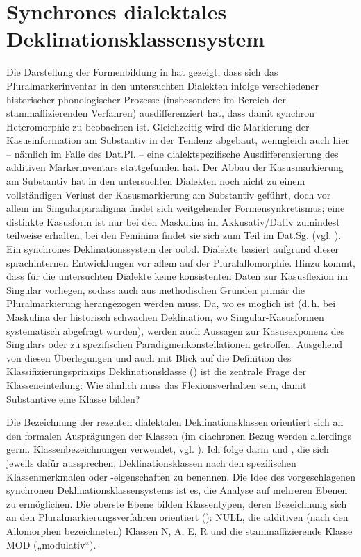 \section{Synchrones dialektales Deklinationsklassensystem}
\label{sec:8.1}
Die Darstellung der Formenbildung in  hat gezeigt, dass sich das Pluralmarkerinventar in den untersuchten Dialekten infolge verschiedener historischer phonologischer Prozesse (insbesondere im Bereich der stammaffizierenden Verfahren) ausdifferenziert hat, dass damit synchron Heteromorphie zu beobachten ist. Gleichzeitig wird die Markierung der Kasusinformation am Substantiv in der Tendenz abgebaut, wenngleich auch hier -- nämlich im Falle des Dat.Pl. -- eine dialektspezifische Ausdifferenzierung des additiven Markerinventars stattgefunden hat. Der Abbau der Kasusmarkierung am Substantiv hat in den untersuchten Dialekten noch nicht zu einem vollständigen Verlust der Kasusmarkierung am Substantiv geführt, doch vor allem im Singularparadigma findet sich weitgehender Formensynkretismus; eine distinkte Kasusform ist nur bei den Maskulina im Akkusativ/Dativ zumindest teilweise erhalten, bei den Feminina findet sie sich zum Teil im Dat.Sg. (vgl. ). Ein synchrones Deklinationssystem der oobd. Dialekte basiert aufgrund dieser sprachinternen Entwicklungen vor allem auf der Pluralallomorphie. Hinzu kommt, dass für die untersuchten Dialekte keine konsistenten Daten zur Kasusflexion im Singular vorliegen, sodass auch aus methodischen Gründen primär die Pluralmarkierung herangezogen werden muss. Da, wo es möglich ist (d.\,h. bei Maskulina der historisch schwachen Deklination, wo Singular-Kasusformen systematisch abgefragt wurden), werden auch Aussagen zur Kasusexponenz des Singulars oder zu spezifischen Paradigmenkonstellationen getroffen. Ausgehend von diesen Überlegungen und auch mit Blick auf die Definition des Klassifizierungsprinzips Deklinationsklasse () ist die zentrale Frage der Klasseneinteilung: Wie ähnlich muss das Flexionsverhalten sein, damit Substantive eine Klasse bilden?

Die Bezeichnung der rezenten dialektalen Deklinationsklassen orientiert sich an den formalen Ausprägungen der Klassen (im diachronen Bezug werden allerdings germ. Klassenbezeichnungen verwendet, vgl. ). Ich folge darin \citet[27]{Rowley1997} und \citet[124]{Wurzel1984}, die sich jeweils dafür aussprechen, Deklinationsklassen nach den spezifischen Klassenmerkmalen oder -eigenschaften zu benennen. Die Idee des vorgeschlagenen synchronen Deklinationsklassensystems ist es, die Analyse auf mehreren Ebenen zu ermöglichen. Die oberste Ebene bilden Klassentypen, deren Bezeichnung sich an den Pluralmarkierungsverfahren orientiert (): NULL, die additiven (nach den Allomorphen bezeichneten) Klassen N, A, E, R und die stammaffizierende Klasse MOD („modulativ“).\largerpage

